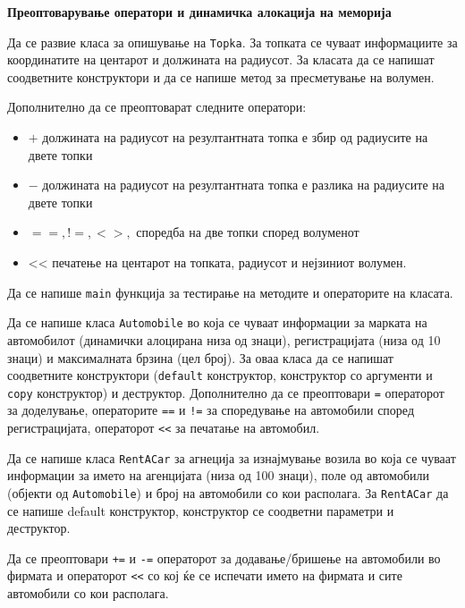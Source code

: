\documentclass[12pt,a4paper]{exam}
\begin{document}
\pagestyle{headandfoot}
\headrule
{}
\begin{center}
\Large{\textbf{Преоптоварување оператори и динамичка алокација на меморија}}
\end{center}
\begin{questions}

\question
Да се развие класа за опишување на \texttt{Topka}. За топката се чуваат
информациите за координатите на центарот и должината на радиусот. За класата да
се напишат соодветните конструктори и да се напише метод за пресметување на
волумен.

Дополнително да се преоптоварат следните оператори:
\begin{itemize}
  \item $+$ должината на радиусот на резултантната топка е збир од радиусите на
  двете топки
  \item $-$ должината на радиусот на резултантната топка е разлика на радиусите на
  двете топки
  \item $==, !=, <>,$ споредба на две топки според волуменот
  \item << печатење на центарот на топката, радиусот и нејзиниот волумен.
\end{itemize}

Да се напише \texttt{main} функција за тестирање на методите и операторите на класата.

\question
Да се напише класа \texttt{Automobile} во која се чуваат информации за марката
на автомобилот (динамички алоцирана низа од знаци), регистрацијата (низа од 10
знаци) и максималната брзина (цел број). За оваа класа да се напишат
соодветните конструктори (\texttt{default} конструктор, конструктор со аргументи и \texttt{copy}
конструктор) и деструктор. Дополнително да се преоптовари \texttt{=} операторот
за доделување, операторите \texttt{==} и \texttt{!=} за споредување на
автомобили според регистрацијата, операторот \texttt{<<} за печатање на автомобил.

Да се напише класа \texttt{RentACar} за агнеција за изнајмување возила во која
се чуваат информации за името на агенцијата (низа од 100 знаци), поле од
автомобили (објекти од \texttt{Automobile}) и број на автомобили со кои располага. 
За \texttt{RentACar} да се напише default конструктор, конструктор се соодветни
параметри и деструктор. 

Да се преоптовари \texttt{+=} и \texttt{-=} операторот за додавање/бришење
на автомобили во фирмата и операторот \texttt{<<} со кој ќе се испечати името на фирмата
и сите автомобили со кои располага. 


\end{questions}
\end{document}
